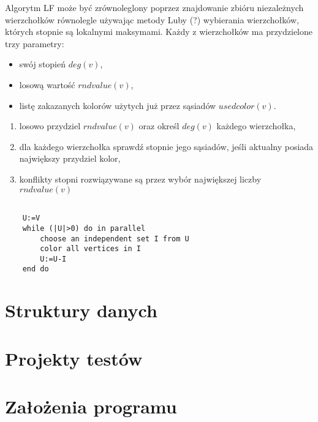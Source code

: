 \documentclass{article}
\begin{document}

	Algorytm LF może być zrównoleglony poprzez 	 znajdowanie zbióru niezależnych wierzchołków równolegle używając metody Luby (?) wybierania wierzchołków, których stopnie są lokalnymi maksymami.
	Każdy z wierzchołków ma przydzielone trzy parametry:
	\begin{itemize}
		\itemsep0em
		\item swój stopień $deg(v)$,
		\item losową wartość $rndvalue(v)$, 
		\item listę zakazanych kolorów użytych już przez sąsiadów $usedcolor(v)$. 
	\end{itemize}   
	\begin{enumerate}
		\item losowo przydziel $rndvalue(v)$ oraz określ $deg(v)$ każdego wierzchołka,
		\item dla każdego wierzchołka sprawdź stopnie jego sąsiadów, jeśli aktualny posiada największy przydziel kolor,
		\item konflikty stopni rozwiązywane są przez wybór największej liczby $rndvalue(v)$
	\end{enumerate}
	\begin{lstlisting}
	
	U:=V
	while (|U|>0) do in parallel
		choose an independent set I from U
		color all vertices in I
		U:=U-I
	end do
	\end{lstlisting}
 
	\section{Struktury danych}
	\section{Projekty testów}
	\section{Założenia programu}
	
\end{document}
